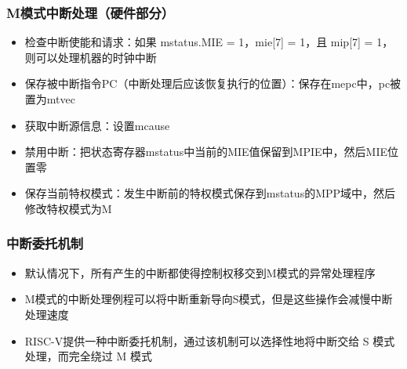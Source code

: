 \begin{frame}[fragile]
    \frametitle{M模式中断处理（硬件部分）}
    \begin{itemize}
        \item 检查中断使能和请求：如果 mstatus.MIE = 1，mie[7] = 1，且 mip[7] = 1，则可以处理机器的时钟中断
        \item 保存被中断指令PC（中断处理后应该恢复执行的位置）：保存在mepc中，pc被置为mtvec
        \item 获取中断源信息：设置mcause
        \item 禁用中断：把状态寄存器mstatus中当前的MIE值保留到MPIE中，然后MIE位置零
        \item 保存当前特权模式：发生中断前的特权模式保存到mstatus的MPP域中，然后修改特权模式为M
    \end{itemize}
\end{frame}

\begin{frame}[fragile]
    \frametitle{中断委托机制}
    \begin{itemize}
        \item 默认情况下，所有产生的中断都使得控制权移交到M模式的异常处理程序
        \item M模式的中断处理例程可以将中断重新导向S模式，但是这些操作会减慢中断处理速度
        \item RISC-V提供一种中断委托机制，通过该机制可以选择性地将中断交给 S 模式处理，而完全绕过 M 模式
    \end{itemize}
\end{frame}

